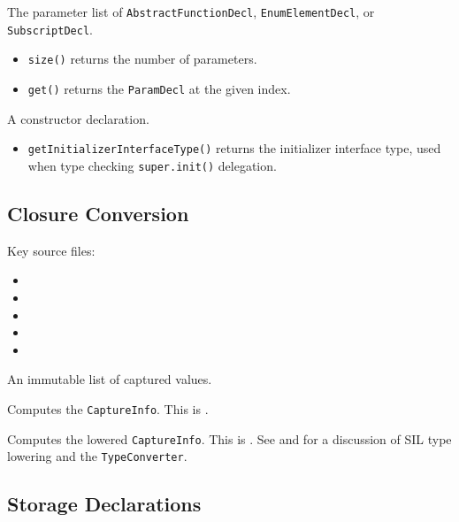 \documentclass[../generics]{subfiles}
\begin{document}
The parameter list of \texttt{AbstractFunctionDecl}, \texttt{EnumElementDecl}, or \texttt{SubscriptDecl}.
\begin{itemize}
\item \texttt{size()} returns the number of parameters.
\item \texttt{get()} returns the \texttt{ParamDecl} at the given index.
\end{itemize}

A constructor declaration.
\begin{itemize}
\item \texttt{getInitializerInterfaceType()} returns the initializer interface type, used when type checking \texttt{super.init()} delegation.
\end{itemize}

\subsection*{Closure Conversion}

Key source files:
\begin{itemize}
\item {}
\item {}
\item {}
\item {}
\item {}
\end{itemize}

An immutable list of captured values.

Computes the \texttt{CaptureInfo}. This is .

Computes the lowered \texttt{CaptureInfo}. This is . See  and  for a discussion of SIL type lowering and the \texttt{TypeConverter}.

\subsection*{Storage Declarations}
\end{document}
